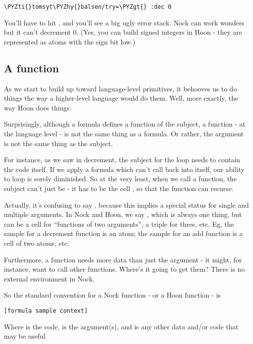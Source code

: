 \begin{framed_shaded}
\begin{Verbatim}[fontsize=\relsize{-2.5},fontseries=b,commandchars=\\\{\}]
\PYZti{}tomsyt\PYZhy{}balsen/try=\PYZgt{} :dec 0
\end{Verbatim}
\end{framed_shaded}
You'll have to hit , and you'll see a big ugly error stack.
Nock can work wonders but it can't decrement 0.  (Yes, you can
build signed integers in Hoon - they are represented as atoms
with the sign bit low.)

\subsection{A function}

As we start to build up toward language-level primitives, it
behooves us to do things the way a higher-level language would do
them.  Well, more exactly, the way Hoon does things.

Surprisingly, although a formula defines a function of the
subject, a function - at the language level - is not the same
thing as a formula.  Or rather, the argument is not the same
thing as the subject.

For instance, as we saw in decrement, the subject for the loop
needs to contain the code itself.  If we apply a formula which
can't call back into itself, our ability to loop is sorely
diminished.  So at the very least, when we call a function,
the subject can't just be  - it has to be the cell
, so that the function can recurse.

Actually, it's confusing to say , because this implies
a special status for single and multiple arguments.  In Nock and
Hoon, we say , which is always one thing, but can be a
cell for ``functions of two arguments'', a triple for three, etc.
Eg, the sample for a decrement function is an atom; the sample
for an add function is a cell of two atoms; etc.

Furthermore, a function needs more data than just the argument -
it might, for instance, want to call other functions.  Where's it
going to get them?  There is no external environment in Nock.

So the standard convention for a Nock function - or a Hoon
function - is

\begin{framed_shaded}
\begin{Verbatim}[fontsize=\relsize{-2.5},fontseries=b,commandchars=\\\{\}]
[formula sample context]
\end{Verbatim}
\end{framed_shaded}
Where  is the code,  is the argument(s), and
 is any other data and/or code that may be useful.

